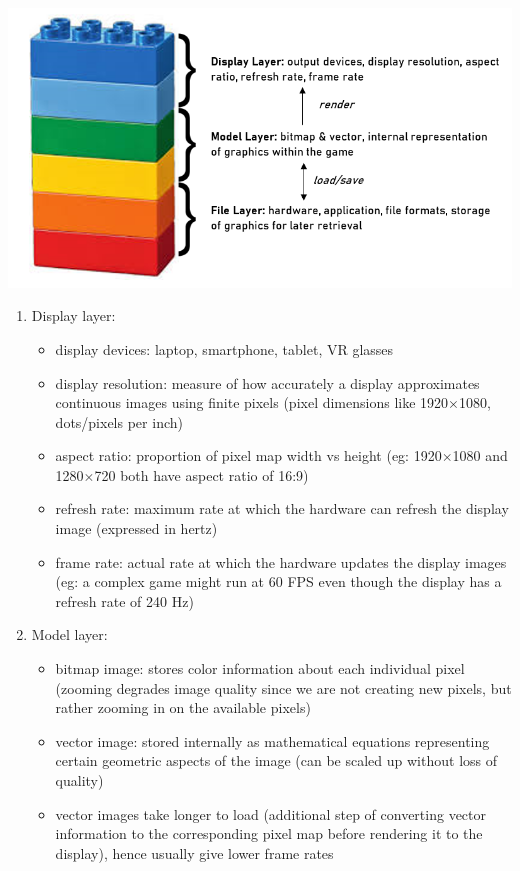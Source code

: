 \documentclass{article}[a4paper,12pt]
\theoremstyle{definition}
\begin{document}
\includegraphics[width=\textwidth]{graphics_concepts.png}
\begin{enumerate}
	\item Display layer:
	\begin{itemize}
		\item display devices: laptop, smartphone, tablet, VR glasses
		\item display resolution: measure of how accurately a display approximates continuous images using finite pixels (pixel dimensions like 1920$\times$1080, dots/pixels per inch)
		\item aspect ratio: proportion of pixel map width vs height (eg: 1920$\times$1080 and 1280$\times$720 both have aspect ratio of 16:9)
		\item refresh rate: maximum rate at which the hardware can refresh the display image (expressed in hertz)
		\item frame rate: actual rate at which the hardware updates the display images (eg: a complex game might run at 60 FPS even though the display has a refresh rate of 240 Hz)
	\end{itemize}
	\item Model layer:
	\begin{itemize}
		\item bitmap image: stores color information about each individual pixel (zooming degrades image quality since we are not creating new pixels, but rather zooming in on the available pixels)
		\item vector image: stored internally as mathematical equations representing certain geometric aspects of the image (can be scaled up without loss of quality)
		\item vector images take longer to load (additional step of converting vector information to the corresponding pixel map before rendering it to the display), hence usually give lower frame rates

\end{itemize}
\end{enumerate}
\end{document}
